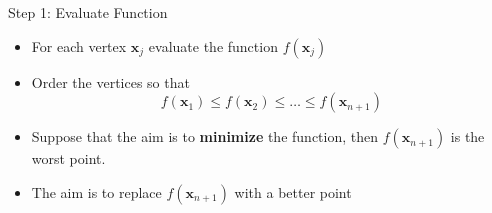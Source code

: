 \documentclass[10pt]{beamer}
\begin{document}
                                                                                              \begin{frame}{Step 1: Evaluate Function}
                                                                                                \begin{itemize}
                                                                                                \item For each vertex ${\bm x_j}$ evaluate the function $f({\bm x_j})$

                                                                                                \item Order the vertices so that
                                                                                                  \begin{equation}
                                                                                                    f({\bm x_1})\leq f({\bm x_2})\leq\ldots\leq f({\bm x_{n+1}})
                                                                                                  \end{equation}

                                                                                                \item Suppose that the aim is to {\bf minimize} the function, then $f({\bm x_{n+1}})$ is the worst point.

                                                                                                \item The aim is to replace $f({\bm x_{n+1}})$ with a  better point
                                                                                                \end{itemize}
                                                                                              \end{frame}
\end{document}
